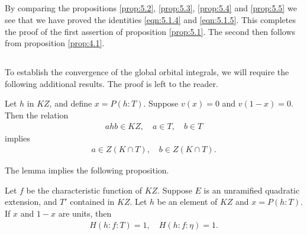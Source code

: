 \subsection{}
By comparing the propositions \ref{prop:5.2}, \ref{prop:5.3}, 
\ref{prop:5.4} and \ref{prop:5.5} we see that we have proved the identities \eqref{eqn:5.1.4} and \eqref{eqn:5.1.5}.
This completes the proof of the first assertion of proposition \ref{prop:5.1}.
The second then follows from proposition \ref{prop:4.1}.

\subsection{}

To establish the convergence of the global orbital integrals, we will require the following additional results. The proof is left to the reader.

\begin{lemma}
Let $h$ in $KZ$, and define $x = P(h:T)$.
Suppose $v(x) = 0$ and $v(1-x)=0$.
Then the relation
\begin{align*}
ahb \in KZ, \quad a \in T, \quad b \in T
\end{align*}
implies
\begin{align*}
a \in Z(K \cap T), \quad b \in Z(K \cap T).
\end{align*}
\end{lemma}
The lemma implies the following proposition.
\begin{proposition}
Let $f$ be the characteristic function of $KZ$.
Suppose $E$ is an unramified quadratic extension, and $T'$ contained in $KZ$.
Let $h$ be an element of $KZ$ and $x = P(h:T)$.
If $x$ and $1-x$ are units, then
\begin{align*}
H(h:f:T) =1, \quad H(h:f:\eta) = 1.
\end{align*}
\end{proposition}